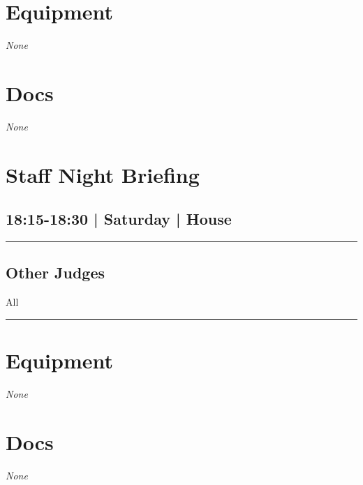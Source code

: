 \documentclass[10pt, A5]{article}
\begin{document}
\begin{framed}
\begin{minipage}{\textwidth}
\begin{multicols}{2}
		\section*{\faWrench \: Equipment}

				\textit{None}
		
		\vfill\null
		\columnbreak

			\section*{\faFile \: Docs}
		 	\textit{None}
	

		\vfill\null

		\end{multicols}
\end{minipage}
\end{framed}
        \begin{framed}
        \begin{minipage}{\textwidth}

        \setcounter{section}{37}
        \section{Staff Night Briefing}
        \subsection*{18:15-18:30 | Saturday | House}

        \vspace{0.25cm}
        \hrule
        \vspace{0.25cm}


        \subsection*{Other Judges}
                    All

            \vspace{0.25cm}
        \hrule
        \vspace{0.25cm}

        \begin{multicols}{2}

		\section*{\faWrench \: Equipment}

				\textit{None}
		
		\vfill\null
		\columnbreak

			\section*{\faFile \: Docs}
		 	\textit{None}
	

		\vfill\null

		\end{multicols}
\end{minipage}
\end{framed}
\end{document}
